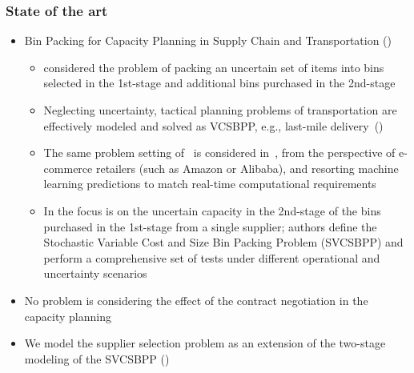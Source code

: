 \documentclass[9pt,xcolor={dvipsnames}]{beamer}
\begin{document}
\begin{frame}%
	\frametitle{State of the art}
	\begin{itemize}
		\item<1-> Bin Packing for Capacity Planning in Supply Chain and Transportation (\cite{chapterBernard2024}) 
		\begin{itemize}
        	\item<1-> \cite{crainic2016logistics} considered the problem of packing an uncertain set of items into bins selected in the 1st-stage and additional bins purchased in the 2nd-stage
	        \item<2-> Neglecting uncertainty, tactical planning problems of transportation are effectively modeled and solved as VCSBPP, e.g., last-mile delivery~(\cite{perboli2021new})
		    \item<3-> The same problem setting of~\cite{crainic2016logistics} is considered in~\cite{bruni2023machine}, from the perspective of e-commerce retailers (such as Amazon or Alibaba), and resorting machine learning predictions to match real-time computational requirements
	        \item<4-> In \cite{crainic2024} the focus is on the uncertain capacity in the 2nd-stage of the bins purchased in the 1st-stage from a single supplier; %
	        authors define the Stochastic Variable Cost and Size Bin Packing Problem (SVCSBPP) and perform a comprehensive set of tests under different operational and uncertainty scenarios
		\end{itemize}
    	\item<5-> No problem is considering the effect of the contract negotiation in the capacity planning
	    \item<6-> We model the supplier selection problem as an extension of the two-stage modeling of the SVCSBPP (\cite{crainic2024})
	\end{itemize}
\end{frame}
\end{document}
